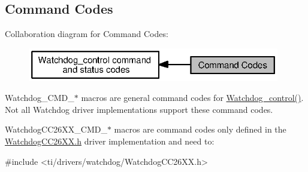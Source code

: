\subsection{Command Codes}
\label{group___watchdog___c_m_d}
Collaboration diagram for Command Codes\+:
\nopagebreak
\begin{figure}[H]
\begin{center}
\leavevmode
\includegraphics[width=311pt]{group___watchdog___c_m_d}
\end{center}
\end{figure}
Watchdog\+\_\+\+C\+M\+D\+\_\+$\ast$ macros are general command codes for \hyperlink{_watchdog_8h_aa98a75361edb1e476432669169f2950e}{Watchdog\+\_\+control()}. Not all Watchdog driver implementations support these command codes.

Watchdog\+C\+C26\+X\+X\+\_\+\+C\+M\+D\+\_\+$\ast$ macros are command codes only defined in the \hyperlink{_watchdog_c_c26_x_x_8h}{Watchdog\+C\+C26\+X\+X.\+h} driver implementation and need to\+: 
\begin{DoxyCode}
\textcolor{preprocessor}{#include <ti/drivers/watchdog/WatchdogCC26XX.h>}
\end{DoxyCode}
 